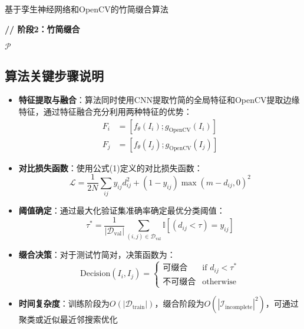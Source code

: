 \documentclass{article}
\begin{document}
\begin{algorithm}[H]
    \caption{基于孪生神经网络和OpenCV的竹简缀合算法}
    \SetAlgoLined
    \textbf{// 阶段2：竹简缀合}

\Return $\mathcal{P}$
\end{algorithm}

\subsection{算法关键步骤说明}

\begin{itemize}
\item \textbf{特征提取与融合}：算法同时使用CNN提取竹简的全局特征和OpenCV提取边缘特征，通过特征融合充分利用两种特征的优势：
\begin{align*}
F_i &= [f_{\theta}(I_i); g_{\text{OpenCV}}(I_i)] \\
F_j &= [f_{\theta}(I_j); g_{\text{OpenCV}}(I_j)]
\end{align*}

\item \textbf{对比损失函数}：使用公式(1)定义的对比损失函数：
\[
\mathcal{L} = \frac{1}{2N} \sum_{ij} y_{ij} d_{ij}^2 + (1 - y_{ij}) \max(m - d_{ij}, 0)^2
\]

\item \textbf{阈值确定}：通过最大化验证集准确率确定最优分类阈值：
\[
\tau^* = \frac{1}{|\mathcal{D}_{\text{val}}|} \sum_{(i,j) \in \mathcal{D}_{\text{val}}} \mathbb{I}[(d_{ij} < \tau) = y_{ij}]
\]

\item \textbf{缀合决策}：对于测试竹简对，决策函数为：
\[
\text{Decision}(I_i, I_j) = \begin{cases} 
\text{可缀合} & \text{if } d_{ij} < \tau^* \\
\text{不可缀合} & \text{otherwise}
\end{cases}
\]

\item \textbf{时间复杂度}：训练阶段为$O(|\mathcal{D}_{\text{train}}|)$，缀合阶段为$O(|\mathcal{I}_{\text{incomplete}}|^2)$，可通过聚类或近似最近邻搜索优化
\end{itemize}
\end{document}
